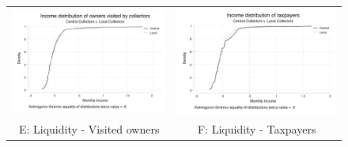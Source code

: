 \documentclass[12pt,english]{article}
\begin{document}
\begin{figure}[H]
\begin{tabular}{cc}
\includegraphics[scale=.55]{Output/dist_inc_visited.pdf} & \includegraphics[scale=.55]{Output/dist_inc_taxpayers.pdf}\\
E: Liquidity - Visited owners & F: Liquidity - Taxpayers  \\

\end{tabular}
\end{figure}
\end{document}
